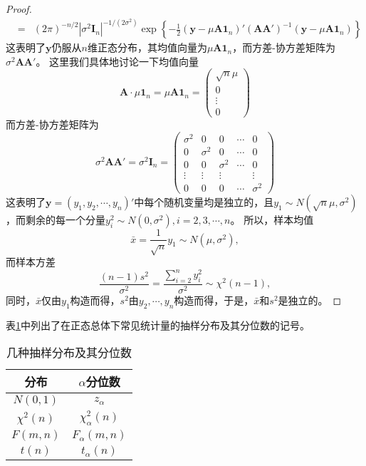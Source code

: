 \begin{proof}
\begin{eqnarray*}
&=& (2\pi)^{-n/2} |\sigma^2 \bm{I}_n|^{-1/(2\sigma^2)} \exp\left\{-\frac{1}{2} (\bm{y}- \mu\bm{A} \bm{1}_n)' (\bm{A}\bm{A}')^{-1}(\bm{y}- \mu \bm{A} \bm{1}_n)\right\}
\end{eqnarray*}
这表明了$\bm{y}$仍服从$n$维正态分布，其均值向量为$\mu\bm{A} \bm{1}_n$，而方差-协方差矩阵为$\sigma^2 \bm{A}\bm{A}'$。
这里我们具体地讨论一下均值向量
$$
\bm{A}\cdot \mu \bm{1}_n = \mu \bm{A}\bm{1}_n = \begin{pmatrix}
    \sqrt{n}\mu\\0\\\vdots\\0
\end{pmatrix}
$$
而方差-协方差矩阵为
$$
\sigma^2 \bm{A}\bm{A}'= \sigma^2 \bm{I}_n =  \begin{pmatrix}
    \sigma^2 & 0 & 0 & \cdots & 0 \\
   0& \sigma^2  & 0 & \cdots & 0 \\
   0&  0 &\sigma^2   & \cdots & 0 \\
   \vdots & \vdots & \vdots &&\vdots\\
    0&  0  & 0  & \cdots &\sigma^2 
\end{pmatrix}
$$
这表明了$\bm{y}=(y_1,y_2,\cdots,y_n)'$中每个随机变量均是独立的，且$y_1\sim N(\sqrt{n}\mu,\sigma^2)$，而剩余的每一个分量$y_i^2 \sim N(0,\sigma^2),i=2,3,\cdots,n$。
所以，样本均值
$$
\bar{x} = \frac{1}{\sqrt{n}} y_1 \sim N(\mu,\sigma^2),
$$
而样本方差
$$
\frac{(n-1)s^2}{\sigma^2} = \frac{\sum_{i=2}^n y_i^2}{\sigma^2} \sim \chi^2(n-1), 
$$
同时，$\bar{x}$仅由$y_1$构造而得，$s^2$由$y_2,\cdots,y_n$构造而得，于是，$\bar{x}$和$s^2$是独立的。
\end{proof}

\begin{remark}
表\ref{tab_lect16_1}中列出了在正态总体下常见统计量的抽样分布及其分位数的记号。
\begin{table}[ht]
\centering
\caption{几种抽样分布及其分位数}\label{tab_lect16_1}
\begin{tabular}{cc}
\hline
分布 & $\alpha$分位数\\
\hline
$N(0,1)$ & $z_{\alpha}$\\
$\chi^2(n)$ & $\chi_{\alpha}^2(n)$\\
$F(m,n)$ & $F_{\alpha}(m,n)$\\
$t(n)$ & $t_{\alpha}(n)$\\
\hline
\end{tabular}
\end{table}
\end{remark}

